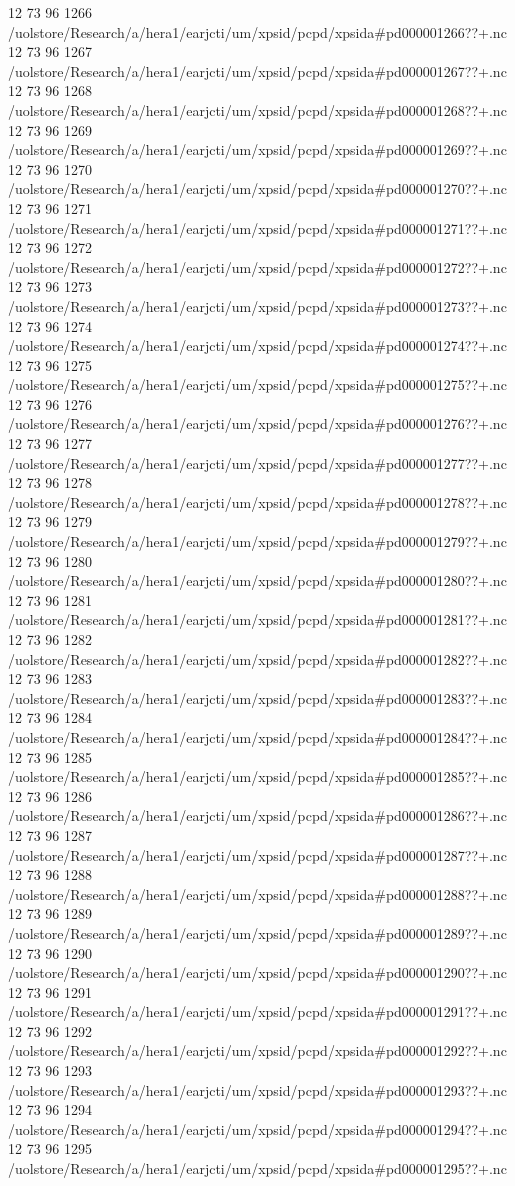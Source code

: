 12 73 96
1266
/uolstore/Research/a/hera1/earjcti/um/xpsid/pcpd/xpsida#pd000001266??+.nc
12 73 96
1267
/uolstore/Research/a/hera1/earjcti/um/xpsid/pcpd/xpsida#pd000001267??+.nc
12 73 96
1268
/uolstore/Research/a/hera1/earjcti/um/xpsid/pcpd/xpsida#pd000001268??+.nc
12 73 96
1269
/uolstore/Research/a/hera1/earjcti/um/xpsid/pcpd/xpsida#pd000001269??+.nc
12 73 96
1270
/uolstore/Research/a/hera1/earjcti/um/xpsid/pcpd/xpsida#pd000001270??+.nc
12 73 96
1271
/uolstore/Research/a/hera1/earjcti/um/xpsid/pcpd/xpsida#pd000001271??+.nc
12 73 96
1272
/uolstore/Research/a/hera1/earjcti/um/xpsid/pcpd/xpsida#pd000001272??+.nc
12 73 96
1273
/uolstore/Research/a/hera1/earjcti/um/xpsid/pcpd/xpsida#pd000001273??+.nc
12 73 96
1274
/uolstore/Research/a/hera1/earjcti/um/xpsid/pcpd/xpsida#pd000001274??+.nc
12 73 96
1275
/uolstore/Research/a/hera1/earjcti/um/xpsid/pcpd/xpsida#pd000001275??+.nc
12 73 96
1276
/uolstore/Research/a/hera1/earjcti/um/xpsid/pcpd/xpsida#pd000001276??+.nc
12 73 96
1277
/uolstore/Research/a/hera1/earjcti/um/xpsid/pcpd/xpsida#pd000001277??+.nc
12 73 96
1278
/uolstore/Research/a/hera1/earjcti/um/xpsid/pcpd/xpsida#pd000001278??+.nc
12 73 96
1279
/uolstore/Research/a/hera1/earjcti/um/xpsid/pcpd/xpsida#pd000001279??+.nc
12 73 96
1280
/uolstore/Research/a/hera1/earjcti/um/xpsid/pcpd/xpsida#pd000001280??+.nc
12 73 96
1281
/uolstore/Research/a/hera1/earjcti/um/xpsid/pcpd/xpsida#pd000001281??+.nc
12 73 96
1282
/uolstore/Research/a/hera1/earjcti/um/xpsid/pcpd/xpsida#pd000001282??+.nc
12 73 96
1283
/uolstore/Research/a/hera1/earjcti/um/xpsid/pcpd/xpsida#pd000001283??+.nc
12 73 96
1284
/uolstore/Research/a/hera1/earjcti/um/xpsid/pcpd/xpsida#pd000001284??+.nc
12 73 96
1285
/uolstore/Research/a/hera1/earjcti/um/xpsid/pcpd/xpsida#pd000001285??+.nc
12 73 96
1286
/uolstore/Research/a/hera1/earjcti/um/xpsid/pcpd/xpsida#pd000001286??+.nc
12 73 96
1287
/uolstore/Research/a/hera1/earjcti/um/xpsid/pcpd/xpsida#pd000001287??+.nc
12 73 96
1288
/uolstore/Research/a/hera1/earjcti/um/xpsid/pcpd/xpsida#pd000001288??+.nc
12 73 96
1289
/uolstore/Research/a/hera1/earjcti/um/xpsid/pcpd/xpsida#pd000001289??+.nc
12 73 96
1290
/uolstore/Research/a/hera1/earjcti/um/xpsid/pcpd/xpsida#pd000001290??+.nc
12 73 96
1291
/uolstore/Research/a/hera1/earjcti/um/xpsid/pcpd/xpsida#pd000001291??+.nc
12 73 96
1292
/uolstore/Research/a/hera1/earjcti/um/xpsid/pcpd/xpsida#pd000001292??+.nc
12 73 96
1293
/uolstore/Research/a/hera1/earjcti/um/xpsid/pcpd/xpsida#pd000001293??+.nc
12 73 96
1294
/uolstore/Research/a/hera1/earjcti/um/xpsid/pcpd/xpsida#pd000001294??+.nc
12 73 96
1295
/uolstore/Research/a/hera1/earjcti/um/xpsid/pcpd/xpsida#pd000001295??+.nc
